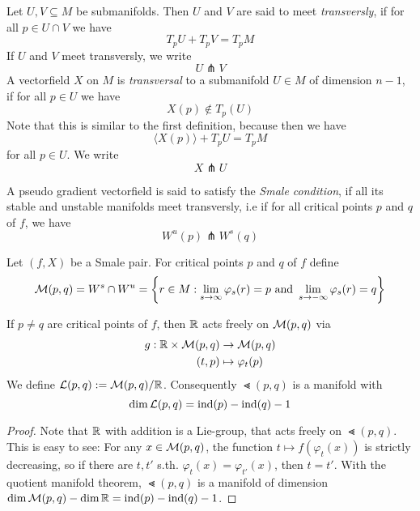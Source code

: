 \begin{definition}[Transversality]
    Let $U, V \subseteq M$ be submanifolds. Then $U$ and $V$ are said to meet 
    \textit{transversly}, if for all $p \in U \cap V$ we have
    \[ T_pU + T_pV = T_pM \]
    If $U$ and $V$ meet transversly, we write
    \[ U \pitchfork V \]
    A vectorfield $X$ on $M$ is \textit{transversal} to a submanifold $U \in M$ of dimension
    $n - 1$, if for all $p \in U$ we have 
    \[ X(p) \notin T_p(U) \]
    Note that this is similar to the first definition, because then we have
    \[ \langle X(p) \rangle + T_pU = T_pM \]
    for all $p \in U$.
    We write 
    \[ X \pitchfork U \]
\end{definition}

\begin{definition}
    A pseudo gradient vectorfield is said to satisfy the \textit{Smale condition}, if
    all its stable and unstable manifolds meet transversly, i.e if for all critical points
    $p$ and $q$ of $f$, we have
    \[ W^u(p) \pitchfork W^s(q) \]
\end{definition}

\begin{prop}
    Let $(f, X)$ be a Smale pair. For critical points $p$ and $q$ of $f$ define
    \[ { \mathcal{M} }(p, q) = W^s \cap W^u = 
    \left\{ r \in M : \lim_{s \to \infty} \varphi_s(r) = p \text{ and } 
    \lim_{s \to -\infty} \varphi_s(r) = q \right\} \]
\end{prop}

\begin{prop}
    If $p \neq q$ are critical points of $f$, then
    ${ \mathbb R }$ acts freely on ${ \mathcal{M} }(p, q)$ via 
    \begin{align*}
        g: { \mathbb R } \times { \mathcal{M} }(p, q) & \to { \mathcal{M} }(p, q) \\
        (t, p) & \mapsto \varphi_t(p)
    \end{align*}
    We define ${ \mathcal{L} }(p, q) := { \mathcal{M} }(p, q)/{ \mathbb R }$. 
    Consequently $\Lt(p, q)$ is a manifold with 
    \[ \dim { \mathcal{L} }(p, q)  = { \operatorname{ind} } (p) - { \operatorname{ind} } (q) - 1 \]
\end{prop}

\begin{proof}
    Note that ${ \mathbb R }$ with addition is a Lie-group, that acts freely on $\Lt(p, q)$. 
    This is easy to see:
    For any $x \in { \mathcal{M} }(p, q)$, the function $t \mapsto f(\varphi_t(x))$ is strictly
    decreasing, so if there are $t, t'$ s.th. $\varphi_t(x) = \varphi_{t'}(x)$, then
    $t = t'$. With the quotient manifold theorem, $\Lt(p, q)$ is a manifold of dimension
    $\dim { \mathcal{M} }(p, q) - \dim { \mathbb R } = { \operatorname{ind} } (p) - { \operatorname{ind} } (q) - 1 $.
\end{proof}

